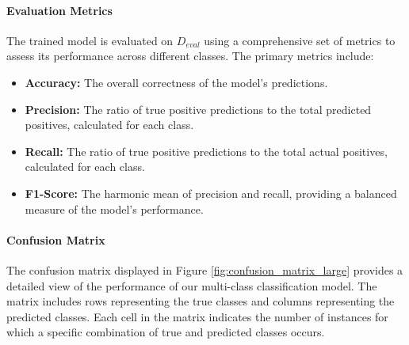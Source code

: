\paragraph{Evaluation Metrics}
The trained model is evaluated on \(D_{eval}\) using a comprehensive set of metrics to assess its performance across different classes. The primary metrics include:

\begin{itemize}
    \item \textbf{Accuracy:} The overall correctness of the model's predictions.
    \item \textbf{Precision:} The ratio of true positive predictions to the total predicted positives, calculated for each class.
    \item \textbf{Recall:} The ratio of true positive predictions to the total actual positives, calculated for each class.
    \item \textbf{F1-Score:} The harmonic mean of precision and recall, providing a balanced measure of the model's performance.
\end{itemize}


\paragraph{Confusion Matrix}
The confusion matrix displayed in Figure \ref{fig:confusion_matrix_large} provides a detailed view of the performance of our multi-class classification model. The matrix includes rows representing the true classes and columns representing the predicted classes. Each cell in the matrix indicates the number of instances for which a specific combination of true and predicted classes occurs.

